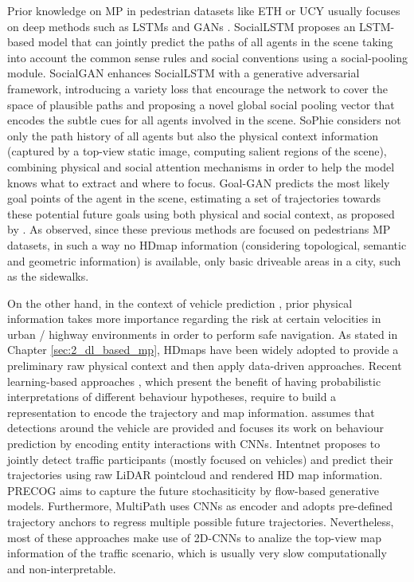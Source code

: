Prior knowledge on \ac{MP} in pedestrian datasets like ETH \cite{pellegrini2009you} or UCY \cite{lerner2007ucydata} usually focuses on deep methods such as \acp{LSTM} \cite{hochreiter1997long} and \acp{GAN} \cite{goodfellow2020generative}. SocialLSTM \cite{alahi2016social} proposes an \ac{LSTM}-based model that can jointly predict the paths of all agents in the scene taking into account the common sense rules and social conventions using a social-pooling module. SocialGAN \cite{gupta2018social} enhances SocialLSTM with a generative adversarial framework, introducing a variety loss that encourage the network to cover the space of plausible paths and proposing a novel global social pooling vector that encodes the subtle cues for all agents involved in the scene. SoPhie \cite{sadeghian2019sophie} considers not only the path history of all agents but also the physical context information (captured by a top-view static image, computing salient regions of the scene), combining physical and social attention mechanisms in order to help the model knows what to extract and where to focus. Goal-GAN \cite{dendorfer2020goal} predicts the most likely goal points of the agent in the scene, estimating a set of trajectories towards these potential future goals using both physical and social context, as proposed by \cite{sadeghian2019sophie}. As observed, since these previous methods are focused on pedestrians \ac{MP} datasets, in such a way no \ac{HDmap} information (considering topological, semantic and geometric information) is available, only basic driveable areas in a city, such as the sidewalks.

On the other hand, in the context of vehicle prediction \cite{chang2019argoverse, caesar2020nuscenes}, prior physical information takes more importance regarding the risk at certain velocities in urban / highway environments in order to perform safe navigation. As stated in Chapter \ref{sec:2_dl_based_mp}, \acp{HDmap} have been widely adopted to provide a preliminary raw physical context and then apply data-driven approaches. Recent learning-based approaches \cite{hong2019rules, casas2018intentnet}, which present the benefit of having probabilistic interpretations of different behaviour hypotheses, require to build a representation to encode the trajectory and map information. \cite{hong2019rules} assumes that detections around the vehicle are provided and focuses its work on behaviour prediction by encoding entity interactions with \acp{CNN}. Intentnet \cite{casas2018intentnet} proposes to jointly detect traffic participants (mostly focused on vehicles) and predict their trajectories using raw LiDAR pointcloud and rendered HD map information. PRECOG \cite{rhinehart2019precog} aims to capture the future stochasiticity by flow-based generative models. Furthermore, MultiPath \cite{chai2019multipath} uses \acp{CNN} as encoder and adopts pre-defined trajectory anchors to regress multiple possible future trajectories. Nevertheless, most of these approaches make use of 2D-\acp{CNN} to analize the top-view map information of the traffic scenario, which is usually very slow computationally and non-interpretable.

